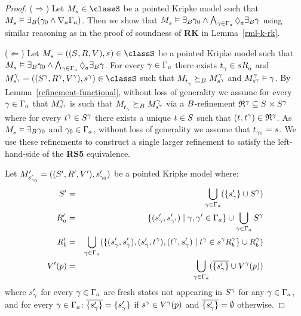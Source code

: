 \begin{proof}
($\Rightarrow$) 
Let $\kPModel{\kStateS} \in \classS$ be a pointed Kripke model such that $\kPModel{\kStateS} \entails \somerefsBs (\gamma_0 \land \coversA \Gamma_\agentA)$.
Then we show that $\kPModel{\kStateS} \entails \somerefsBs \gamma_0 \land \bigwedge_{\gamma \in \Gamma_\agentA} \possibleA \somerefsBs \gamma$ using similar reasoning as in the proof of soundness of {\bf RK} in Lemma~\ref{rml-k-rk}.

($\Leftarrow$)
Let $\kPModelAndTuple{\kStateS} \in \classS$ be a pointed Kripke model such that $\kPModel{\kStateS} \entails \somerefsBs \gamma_0 \land \bigwedge_{\gamma \in \Gamma_\agentA} \possibleA \somerefsBs \gamma$.
For every $\gamma \in \Gamma_\agentA$ there exists $\kStateT_\gamma \in \kSuccessorsA{\kStateS}$ and $\kPModelAndTuple[\gamma]{\kStateS[\gamma]} \in \classS$ such that $\kPModel{\kStateT_\gamma} \simulatesBs \kPModel[\gamma]{\kStateS[\gamma]}$ and $\kPModel[\gamma]{\kStateS[\gamma]} \entails \gamma$.
By Lemma~\ref{refinement-functional}, without loss of generality we assume for every $\gamma \in \Gamma_\agentA$ that $\kPModel[\gamma]{\kStateS[\gamma]}$ is such that $\kPModel{\kStateT_\gamma} \simulatesBs \kPModel[\gamma]{\kStateS[\gamma]}$ via a $\agentsB$-refinement $\refinement^{\gamma} \subseteq \kStates \times \kStates[\gamma]$ where for every $\kStateT[\gamma] \in \kStates[\gamma]$ there exists a unique $\kStateT \in \kStates$ such that $(\kStateT, \kStateT[\gamma]) \in \refinement^{\gamma}$.
As $\kPModel{\kStateS} \entails \somerefsBs \gamma_0$ and $\gamma_0 \in \Gamma_\agentA$, without loss of generality we assume that $\kStateT_{\gamma_0} = \kStateS$.
We use these refinements to construct a single larger refinement to satisfy the left-hand-side of the {\bf RS5} equivalence.

Let $\kPModelAndTupleP{\kStateSP_{\gamma_0}}$ be a pointed Kripke model where:
\begin{eqnarray*}
    \kStatesP &=& \bigcup_{\gamma \in \Gamma_\agentA} (\{\kStateSP_\gamma\} \cup \kStates[\gamma])\\
    \kAccessibilityPA &=& \{(\kStateSP_\gamma, \kStateSP_{\gamma'}) \mid \gamma, \gamma' \in \Gamma_\agentA\} \cup \bigcup_{\gamma \in \Gamma_\agentA} \kStates[\gamma]\\
    \kAccessibilityPB &=& \bigcup_{\gamma \in \Gamma_\agentA} (\{(\kStateSP_\gamma, \kStateSP_\gamma), (\kStateSP_\gamma, \kStateT[\gamma]), (\kStateT[\gamma], \kStateSP_\gamma) \mid \kStateT[\gamma] \in \kSuccessorsB[\gamma]{\kStateS[\gamma]}\} \cup \kAccessibilityB[\gamma])\\
    \kValuationP(\atomP) &=& \bigcup_{\gamma \in \Gamma_\agentA} (\overline{\{\kStateSP_\gamma\}} \cup \kValuation[\gamma](\atomP))
\end{eqnarray*}
where $\kStateSP_\gamma$ for every $\gamma \in \Gamma_\agentA$ are fresh states not appearing in $\kStates[\gamma]$ for any $\gamma \in \Gamma_\agentA$, and for every $\gamma \in \Gamma_\agentA$: $\overline{\{\kStateSP_\gamma\}} = \{\kStateSP_\gamma\}$ if $\kStateS[\gamma] \in \kValuation[\gamma](\atomP)$ and $\overline{\{\kStateSP_\gamma\}} = \emptyset$ otherwise.


\end{proof}
